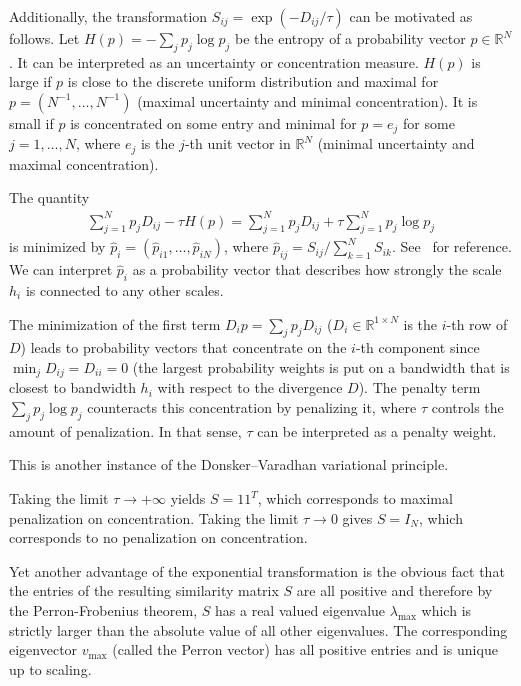 Additionally, the transformation $S_{ij}=\exp{(-D_{ij}/\tau)}$ can be motivated as follows. Let $H(p)=-\sum_jp_j\log{p_j}$ be the entropy of a probability vector $p\in\mathbb{R}^{N}$. It can be interpreted as an uncertainty or concentration measure. $H(p)$ is large if $p$ is close to the discrete uniform distribution and maximal for $p=(N^{-1},\dots,N^{-1})$ (maximal uncertainty and minimal concentration). It is small if $p$ is concentrated on some entry and minimal for $p=e_j$ for some $j=1,\dots,N$, where $e_j$ is the $j$-th unit vector in $\mathbb{R}^N$ (minimal uncertainty and maximal concentration).

The quantity
\begin{align*}
    \sum_{j=1}^{N}p_jD_{ij}-\tau H(p)=\sum_{j=1}^{N}p_jD_{ij}+\tau\sum_{j=1}^{N}p_j\log{p_j}
\end{align*}
is minimized by $\hat{p}_i=(\hat{p}_{i1},\dots,\hat{p}_{iN})$, where $\hat{p}_{ij}=S_{ij}/\sum_{k=1}^{N}S_{ik}$. See~\cite{anantharam_variational_2017} for reference. We can interpret $\hat{p}_i$ as a probability vector that describes how strongly the scale $h_i$ is connected to any other scales.

The minimization of the first term $D_ip=\sum_jp_jD_{ij}$ ($D_i\in\mathbb{R}^{1\times N}$ is the $i$-th row of $D$) leads to probability vectors that concentrate on the $i$-th component since $\min_jD_{ij}=D_{ii}=0$ (the largest probability weights is put on a bandwidth that is closest to bandwidth $h_i$ with respect to the divergence $D$). The penalty term $\sum_jp_j\log{p_j}$ counteracts this concentration by penalizing it, where $\tau$ controls the amount of penalization. In that sense, $\tau$ can be interpreted as a penalty weight. 

This is another instance of the Donsker–Varadhan variational principle.

Taking the limit $\tau\to+\infty$ yields $S=11^{T}$, which corresponds to maximal penalization on concentration. Taking the limit $\tau\to0$ gives $S=I_N$, which corresponds to no penalization on concentration.

Yet another advantage of the exponential transformation is the obvious fact that the entries of the resulting similarity matrix $S$ are all positive and therefore by the Perron-Frobenius theorem, $S$ has a real valued eigenvalue $\lambda_{\max}$ which is strictly larger than the absolute value of all other eigenvalues. The corresponding eigenvector $v_{\max}$ (called the Perron vector) has all positive entries and is unique up to scaling.

